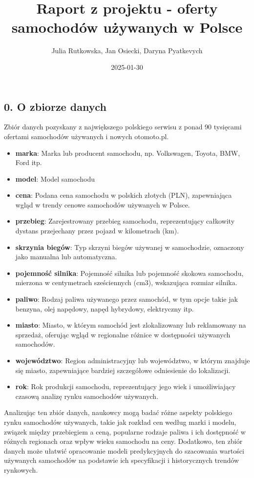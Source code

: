 \documentclass[
]{article}
\title{Raport z projektu - oferty samochodów używanych w Polsce}
\author{Julia Rutkowska, Jan Osiecki, Daryna Pyatkevych}
\date{2025-01-30}
\begin{document}
\maketitle

\subsection{0. O zbiorze danych}\label{o-zbiorze-danych}

Zbiór danych pozyskany z największego polskiego serwisu z ponad 90
tysięcami ofertami samochodów używanych i nowych otomoto.pl.

\begin{itemize}
\item
  \textbf{marka}: Marka lub producent samochodu, np. Volkswagen, Toyota,
  BMW, Ford itp.
\item
  \textbf{model}: Model samochodu
\item
  \textbf{cena}: Podana cena samochodu w polskich złotych (PLN),
  zapewniająca wgląd w trendy cenowe samochodów używanych w Polsce.
\item
  \textbf{przebieg}: Zarejestrowany przebieg samochodu, reprezentujący
  całkowity dystans przejechany przez pojazd w kilometrach (km).
\item
  \textbf{skrzynia biegów}: Typ skrzyni biegów używanej w samochodzie,
  oznaczony jako manualna lub automatyczna.
\item
  \textbf{pojemność silnika}: Pojemność silnika lub pojemność skokowa
  samochodu, mierzona w centymetrach sześciennych (cm3), wskazująca
  rozmiar silnika.
\item
  \textbf{paliwo}: Rodzaj paliwa używanego przez samochód, w tym opcje
  takie jak benzyna, olej napędowy, napęd hybrydowy, elektryczny itp.
\item
  \textbf{miasto}: Miasto, w którym samochód jest zlokalizowany lub
  reklamowany na sprzedaż, oferując wgląd w regionalne różnice w
  dostępności używanych samochodów.
\item
  \textbf{województwo}: Region administracyjny lub województwo, w którym
  znajduje się miasto, zapewniające bardziej szczegółowe odniesienie do
  lokalizacji.
\item
  \textbf{rok}: Rok produkcji samochodu, reprezentujący jego wiek i
  umożliwiający czasową analizę rynku samochodów używanych.
\end{itemize}

Analizując ten zbiór danych, naukowcy mogą badać różne aspekty polskiego
rynku samochodów używanych, takie jak rozkład cen według marki i modelu,
związek między przebiegiem a ceną, popularne rodzaje paliwa i ich
dostępność w różnych regionach oraz wpływ wieku samochodu na ceny.
Dodatkowo, ten zbiór danych może ułatwić opracowanie modeli
predykcyjnych do szacowania wartości używanych samochodów na podstawie
ich specyfikacji i historycznych trendów rynkowych.
\end{document}

